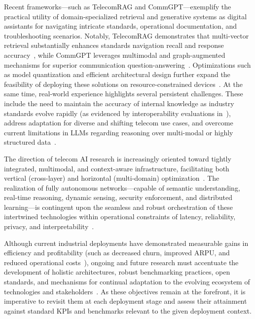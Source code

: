 \documentclass[sigconf]{acmart}
\begin{document}
Recent frameworks—such as TelecomRAG and CommGPT—exemplify the practical utility of domain-specialized retrieval and generative systems as digital assistants for navigating intricate standards, operational documentation, and troubleshooting scenarios. Notably, TelecomRAG demonstrates that multi-vector retrieval substantially enhances standards navigation recall and response accuracy~\cite{ref20}, while CommGPT leverages multimodal and graph-augmented mechanisms for superior communication question-answering~\cite{ref21}. Optimizations such as model quantization and efficient architectural design further expand the feasibility of deploying these solutions on resource-constrained devices~\cite{ref11,ref22,ref29}. At the same time, real-world experience highlights several persistent challenges. These include the need to maintain the accuracy of internal knowledge as industry standards evolve rapidly (as evidenced by interoperability evaluations in~\cite{ref20,ref22}), address adaptation for diverse and shifting telecom use cases, and overcome current limitations in LLMs regarding reasoning over multi-modal or highly structured data~\cite{ref21,ref29}.

The direction of telecom AI research is increasingly oriented toward tightly integrated, multimodal, and context-aware infrastructure, facilitating both vertical (cross-layer) and horizontal (multi-domain) optimization~\cite{ref24,ref25}. The realization of fully autonomous networks—capable of semantic understanding, real-time reasoning, dynamic sensing, security enforcement, and distributed learning—is contingent upon the seamless and robust orchestration of these intertwined technologies within operational constraints of latency, reliability, privacy, and interpretability~\cite{ref14,ref19,ref20,ref24,ref26}.

Although current industrial deployments have demonstrated measurable gains in efficiency and profitability (such as decreased churn, improved ARPU, and reduced operational costs~\cite{ref19}), ongoing and future research must accentuate the development of holistic architectures, robust benchmarking practices, open standards, and mechanisms for continual adaptation to the evolving ecosystem of technologies and stakeholders~\cite{ref11,ref21,ref22,ref23,ref24,ref25,ref49}. As these objectives remain at the forefront, it is imperative to revisit them at each deployment stage and assess their attainment against standard KPIs and benchmarks relevant to the given deployment context.
\end{document}
